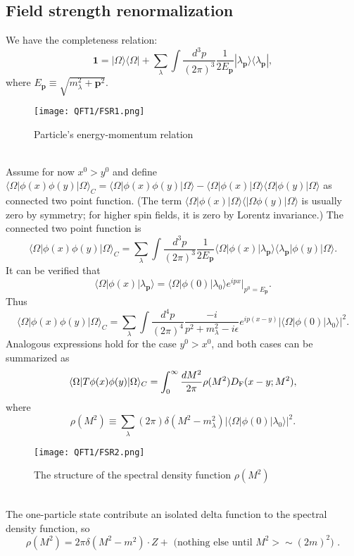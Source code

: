 \subsection{Field strength renormalization}
\noindent
We have the completeness relation:
\[\bm{1} = |\Omega\rangle\langle\Omega| +  \sum_{\lambda} \int \frac{d^3p}{(2\pi)^3} \frac{1}{2E_{\bm{p}}} |\lambda_{\bm{p}}\rangle\langle\lambda_{\bm{p}}|,\]
where $E_{\bm{p}} \equiv \sqrt{m_{\lambda}^2 + \bm{p}^2}$.
\\
\begin{figure}[!h]
\centering
\texttt{[image: QFT1/FSR1.png]}
\caption{Particle's energy-momentum relation}
\end{figure}
\\
Assume for now $x^0 > y^0$ and define $\langle \Omega | \phi(x) \phi(y) | \Omega \rangle_{C} = \langle \Omega | \phi(x) \phi(y) | \Omega \rangle - \langle \Omega | \phi(x)| \Omega \rangle \langle \Omega | \phi(y) | \Omega \rangle$ as connected two point function. (The term $\langle \Omega | \phi(x)| \Omega \rangle \langle | \Omega \phi(y) | \Omega \rangle$ is usually zero by symmetry; for higher spin fields, it is zero by Lorentz invariance.) The connected two point function is
\[\langle \Omega | \phi(x) \phi(y) | \Omega \rangle_{C} = \sum_{\lambda} \int \frac{d^3p}{(2\pi)^3} \frac{1}{2E_{\bm{p}}} \langle \Omega | \phi(x) |\lambda_{\bm{p}}\rangle\langle\lambda_{\bm{p}}| \phi(y) | \Omega \rangle.\]
It can be verified that
\[\langle \Omega | \phi(x) |\lambda_{\bm{p}}\rangle = \langle \Omega | \phi(0) | \lambda_0 \rangle e^{ipx} |_{p^0 = E_{\bm{p}}}.\]
Thus
\[\langle \Omega | \phi(x) \phi(y) | \Omega \rangle_C = \sum_{\lambda} \int \frac{d^4p}{(2\pi)^4} \frac{-i}{p^2 + m_{\lambda}^2 -i\epsilon} e^{ip(x-y)} |\langle \Omega | \phi(0) | \lambda_0 \rangle|^2.\]
Analogous expressions hold for the case $y^0 > x^0$, and both cases can be summarized as
\[\langle \Omega | T \phi(x) \phi(y) | \Omega \rangle_C = \int_0^{\infty} \frac{dM^2}{2\pi} \rho(M^2) D_{\rm F}(x-y;M^2),\]
where 
\[\rho(M^2) \equiv \sum_{\lambda} (2\pi) \delta(M^2-m_{\lambda}^2)|\langle \Omega | \phi(0) | \lambda_0 \rangle|^2 .\]
\begin{figure}[!h]
\centering
\texttt{[image: QFT1/FSR2.png]}
\caption{The structure of the spectral density function $\rho(M^2)$}
\end{figure}
\\
The one-particle state contribute an isolated delta function to the spectral density function, so
\[\rho(M^2) = 2\pi \delta (M^2 -m^2) \cdot Z + \mbox{ (nothing else until $M^2 > \sim (2m)^2$) }.\]
